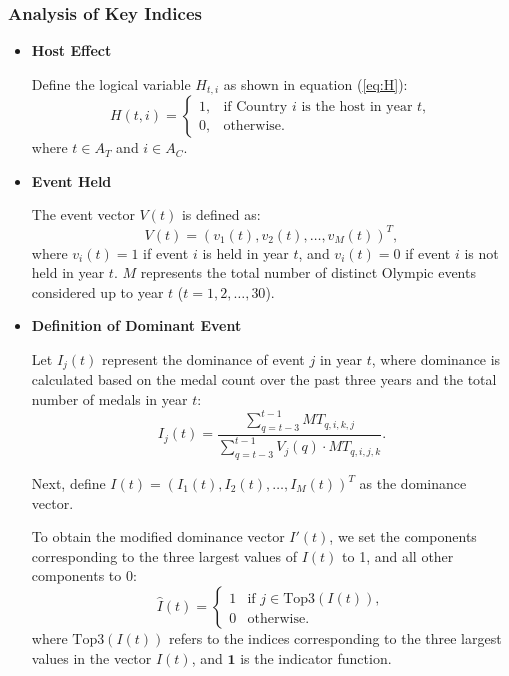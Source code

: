 \documentclass{mcmthesis}
\begin{document}
\subsubsection{Analysis of Key Indices}
\label{ppp}
\begin{itemize}[leftmargin=0.15in, labelsep=0.1in, itemsep=1pt, parsep=0pt]
	\item \textbf{Host Effect}
	
	Define the logical variable \( H_{t,i} \) as shown in equation (\ref{eq:H}):
	\begin{equation*}
		H(t,i) = 
		\begin{cases} 
			1, & \text{if Country } i \text{ is the host in year } t, \\
			0, & \text{otherwise.}
		\end{cases}
		\label{eq:H}
	\end{equation*}
	where \( t \in A_{T} \) and \( i \in A_{C} \).
	
	\item \textbf{Event Held}
	
	The event vector \( V(t) \) is defined as:
	\[
	V(t) = \left( v_1(t), v_2(t), \dots, v_M(t) \right)^T,
	\]
	where \( v_i(t) = 1 \) if event \( i \) is held in year \( t \), and \( v_i(t) = 0 \) if event \( i \) is not held in year \( t \). \( M \) represents the total number of distinct Olympic events considered up to year \( t \) (\( t = 1, 2, \dots, 30 \)).
	
	\item \textbf{Definition of Dominant Event}
	
	Let \( I_j(t) \) represent the dominance of event \( j \) in year \( t \), where dominance is calculated based on the medal count over the past three years and the total number of medals in year \( t \):
	\[
	I_j(t) = \frac{\sum_{q=t-3}^{t-1} MT_{q,i,k,j}}{\sum_{q=t-3}^{t-1} V_j(q) \cdot MT_{q,i,j,k}}.
	\]
	
	Next, define \( I(t) = \left( I_1(t), I_2(t), \dots, I_M(t) \right)^T \) as the dominance vector.
	
	To obtain the modified dominance vector \( I'(t) \), we set the components corresponding to the three largest values of \( I(t) \) to 1, and all other components to 0:
	\[
	\hat{I}(t) = 
	\begin{cases} 
		1 & \text{if } j \in \text{Top3}(I(t)), \\
		0 & \text{otherwise.}
	\end{cases}
	\]
	where \( \text{Top3}(I(t)) \) refers to the indices corresponding to the three largest values in the vector \( I(t) \), and \( \mathbf{1} \) is the indicator function.
	

\end{itemize}
\end{document}
